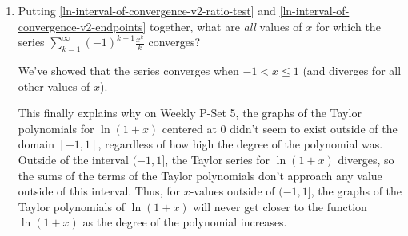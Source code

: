 \documentclass[main]{subfiles}
\begin{document}
\begin{enumerate}
\begin{enumerate}
\begin{solution}
    This is just $-1$ times the
    harmonic series, and we know the harmonic series diverges.  So, the
    power series . 

    If we plug $x = 1$ into the given Taylor series, we get
    $\displaystyle \sum_{k=1}^\infty \frac{(-1)^{k + 1}}{k}$.  This is
    the alternating harmonic series, and we already showed that this series converges due to the Alternating Series Test. So, the Taylor
    series . 
    \end{solution}

    \item
    \begin{problem}[2in]
    Putting \ref{ln-interval-of-convergence-v2-ratio-test} and
    \ref{ln-interval-of-convergence-v2-endpoints} together, what are
    \textit{all} values of $x$ for which the series $\displaystyle
    \sum_{k=1}^\infty (-1)^{k+1} \frac{x^k}{k}$ converges?
    \end{problem}

    \begin{solution}
    We've showed that the series converges when $-1 < x \leq 1$ (and
    diverges for all other values of $x$).
    
    This finally explains why on Weekly P-Set 5, the graphs of the Taylor polynomials for $\ln(1+x)$ centered at 0 didn't seem to exist outside of the domain $[-1,1]$, regardless of how high the degree of the polynomial was. Outside of the interval $(-1, 1]$, the Taylor series for $\ln(1+x)$ diverges, so the sums of the terms of the Taylor polynomials don't approach any value outside of this interval. Thus, for $x$-values outside of $(-1, 1]$, the graphs of the Taylor polynomials of $\ln(1+x)$ will never get closer to the function $\ln(1+x)$ as the degree of the polynomial increases.
    \end{solution}
\end{enumerate}




\end{enumerate}
\end{document}
